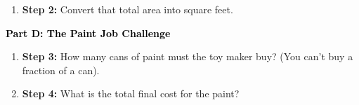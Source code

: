 \documentclass[12pt, letterpaper, fleqn]{article}
\begin{document}
\vspace{3mm}

\begin{enumerate}[itemsep=5.5cm, leftmargin=0.6cm, resume]
\item \textbf{Step 2:} Convert that total area into square feet.
\end{enumerate}

\newpage

\begin{tcolorbox}[colback=customteal!20]
\large\textcolor{black}{\textbf{Part D: The Paint Job Challenge}}
\end{tcolorbox}

\vspace{3mm}

\begin{enumerate}[itemsep=5.5cm, leftmargin=0.6cm, resume]
\item \textbf{Step 3:} How many cans of paint must the toy maker buy? (You can't buy a fraction of a can).
\item \textbf{Step 4:} What is the total final cost for the paint?
\end{enumerate}
\end{document}
